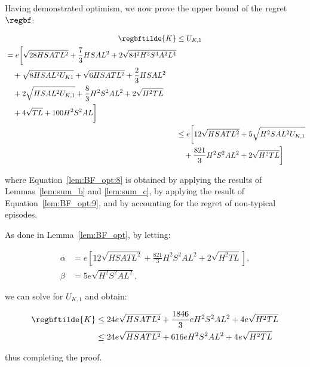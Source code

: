 Having demonstrated optimism, we now prove the upper bound of the regret $\regbf$:

\begin{align}
    \regbftilde{K} &\le U_{K,1} \nonumber \\
    \begin{split}
    \label{lem:BF_opt:8}
    &= e \bigg[ \sqrt{28 HSATL^2} + \frac{7}{3}HSAL^2 + 2\sqrt{84^2 H^3 S^4 A^2 L^4} \\
    &\quad + \sqrt{8 HSAL^2 U_{K1}} +\sqrt{6 HSATL^2} + \frac{2}{3} HSAL^2 \\
    &\quad + 2 \sqrt{HSAL^2 U_{K,1}} + \frac{8}{3} H^2S^2AL^2 + 2\sqrt{H^2TL} \\
    &\quad + 4 \sqrt{TL} + 100 H^2 S^2 A L \bigg]
    \end{split} \\
    &\le e \bigg[ 12 \sqrt{HSATL^2} + 5 \sqrt{H^2 SAL^2 U_{K,1}} \nonumber \\
    &\quad + \frac{821}{3} H^2 S^2 A L^2 + 2 \sqrt{H^2 T L} \bigg]
\end{align}

where Equation~\eqref{lem:BF_opt:8} is obtained by applying the results of Lemmas~\ref{lem:sum_b} and \ref{lem:sum_c}, by applying the result of Equation~\eqref{lem:BF_opt:9}, and by accounting for the regret of non-typical episodes.

As done in Lemma~\ref{lem:BF_opt}, by letting:

\begin{align*}
    \alpha &= e \left[ 12 \sqrt{H S A T L^2} + \frac{821}{3} H^2 S^2 A L^2 + 2 \sqrt{H^2 T L}\right], \\
    \beta &= 5e\sqrt{H^2 S^2 A L^2},
\end{align*}

we can solve for $U_{K,1}$ and obtain:

\begin{align*}
    \regbftilde{K} &\le 24e \sqrt{HSATL^2} + \frac{1846}{3}e H^2 S^2 A L^2 + 4e \sqrt{H^2 T L} \\
    &\le 24e \sqrt{HSATL^2} + 616 e H^2 S^2 A L^2 + 4e \sqrt{H^2 T L}
\end{align*}

thus completing the proof.
